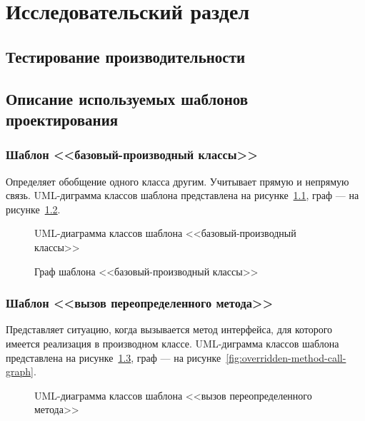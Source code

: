 \chapter{Исследовательский раздел}
\label{cha:research}

\section{Тестирование производительности}

\section{Описание используемых шаблонов проектирования}

\subsection{Шаблон <<базовый-производный классы>>}

Определяет обобщение одного класса другим.
Учитывает прямую и непрямую связь.
UML-диграмма классов шаблона представлена на рисунке~\ref{fig:base-derived-uml},
граф --- на рисунке~\ref{fig:base-derived-graph}.

\begin{figure}[!ht]
\centering
\caption{UML-диаграмма классов шаблона <<базовый-производный классы>>}
\label{fig:base-derived-uml}
\end{figure}

\begin{figure}[!ht]
\centering
\caption{Граф шаблона <<базовый-производный классы>>}
\label{fig:base-derived-graph}
\end{figure}

\subsection{Шаблон <<вызов переопределенного метода>>}

Представляет ситуацию, когда вызывается метод интерфейса,
для которого имеется реализация в производном классе.
UML-диграмма классов шаблона представлена на рисунке~\ref{fig:overridden-method-call-uml},
граф --- на рисунке~\ref{fig:overridden-method-call-graph}.

\begin{figure}[!ht]
\centering
\caption{UML-диаграмма классов шаблона <<вызов переопределенного метода>>}
\label{fig:overridden-method-call-uml}
\end{figure}

